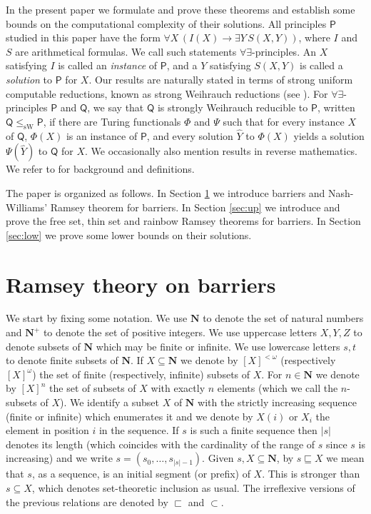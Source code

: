 \documentclass{amsart}
\theoremstyle{plain}
\theoremstyle{plain}
\newcommand{\om}{\omega}
\newcommand\Nat{\mathbf{N}}
\newcommand\sW{\mathrm{sW}}
\newcommand\Q{\mathsf{Q}}
\newcommand\PP{\mathsf{P}}
\begin{document}
In the present paper we formulate and prove these theorems and establish some bounds on the computational complexity of their solutions. All principles $\PP$ studied in this paper have the form
$\forall X\,(I(X)\to \exists Y\,S(X,Y))$, where $I$ and $S$ are arithmetical formulas. We call such statements $\forall\exists$-principles. An $X$ satisfying $I$ is called an {\em instance} of $\PP$, and a $Y$ satisfying $S(X,Y)$ is called a {\em solution} to $\PP$ for $X$. Our results are naturally stated in terms of strong uniform computable reductions, known as strong Weihrauch reductions (see \cite{Dzhafarov.Mummert2022}).
For $\forall\exists$-principles $\PP$ and $\Q$, we say that $\Q$ is strongly Weihrauch reducible to $\PP$,
written $\Q \leq_{\sW} \PP$, if there are Turing functionals $\Phi$ and $\Psi$ such that for every instance $X$ of
$\Q$, $\Phi(X)$ is an instance of $\PP$, and every solution $\hat{Y}$ to $\Phi(X)$ yields a solution $\Psi(\hat{Y})$ to $\Q$ for $X$.
We occasionally also mention results in reverse mathematics. We refer to \cite{Dzhafarov.Mummert2022} for background and definitions. 


The paper is organized as follows. In Section \ref{sec:RT} we introduce barriers and Nash-Williams' Ramsey theorem for barriers. In Section \ref{sec:up} we introduce and prove the free set, thin set and rainbow Ramsey theorems for barriers. In Section \ref{sec:low} we prove some lower bounds on their solutions. 

\section{Ramsey theory on barriers}\label{sec:RT}

We start by fixing some notation. We use $\Nat$ to denote the set of natural numbers and $\Nat^+$ to denote the set of positive integers. We use uppercase letters $X, Y, Z$ to denote subsets of $\Nat$ which may be finite or infinite. We use lowercase letters $s, t$ to denote finite subsets of $\Nat$. 
If $X \subseteq \Nat$ we denote by $[X]^{< \om}$ (respectively $[X]^{\om}$) the set of finite (respectively, infinite) subsets of $X$. For $n \in \Nat$ we denote by $[X]^n$ the set of subsets of $X$ with exactly $n$ elements (which we call the $n$-subsets of $X$).
We identify a subset $X$ of $\Nat$ with the strictly increasing sequence (finite or infinite) which enumerates it and we denote by $X(i)$ or $X_i$ the element in position $i$ in the sequence. If $s$ is such a finite sequence then $|s|$ denotes its length (which coincides with the cardinality of the range of $s$ since $s$ is increasing) and we write $s = (s_0, \ldots, s_{|s|-1})$. 
Given $s, X \subseteq \Nat$, by $s \sqsubseteq X$ we mean that $s$, as a sequence, is an initial segment (or prefix) of $X$. This is stronger than $s \subseteq X$, which denotes set-theoretic inclusion as usual. The irreflexive versions of the previous relations are denoted by $\sqsubset$ and $\subset$.
\end{document}
